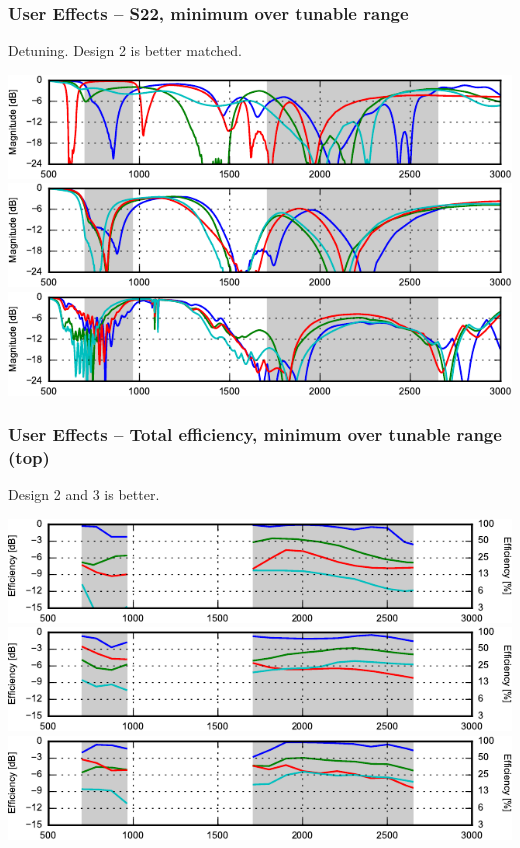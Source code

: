 \begin{frame}
    \frametitle{User Effects -- S22, minimum over tunable range}
    Detuning. Design 2 is better matched.
    \begin{center}
        \includegraphics{img/soren/ue/design1lt/s22side.pdf}\\
        \includegraphics{img/soren/ue/design2sn/s22side.pdf}\\
        \includegraphics{img/soren/ue/design3hv/s22side.pdf}
    \end{center}
    \legendfooter
\end{frame}

\begin{frame}
    \frametitle{User Effects -- Total efficiency, minimum over tunable range (top)}
    Design 2 and 3 is better.
    \begin{center}
        \includegraphics{img/soren/ue/design1lt/efftop.pdf}\\
        \includegraphics{img/soren/ue/design2sn/efftop.pdf}\\
        \includegraphics{img/soren/ue/design3hv/efftop.pdf}
    \end{center}
    \legendfooter
\end{frame}

